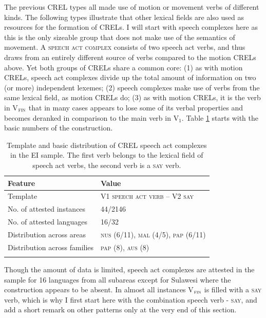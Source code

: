 The previous CREL types all made use of motion or movement verbs of different kinds. The following types  illustrate that other lexical fields are also used as resources for the formation of CRELs. I will start with speech complexes here as this is the only sizeable group that does not make use of the semantics of movement. A \textsc{speech act complex} consists of two speech act verbs, and thus draws from an entirely different source of verbs compared to the motion CRELs above. Yet both groups of CRELs share a common core: (1) as with motion CRELs, speech act complexes divide up the total amount of information on two (or more) independent lexemes; (2) speech complexes make use of verbs from the same lexical field, as motion CRELs do; (3) as with motion CRELs, it is the verb in V$_{\textsc{fin}}$ that in many cases appears to lose some of its verbal properties and becomes deranked in comparison to the main verb in V$_{1}$. Table \ref{table:basiccrelspeech} starts with the basic numbers of the construction.

\begin{table}
\begin{tabular}{ll}
\lsptoprule
Feature&Value\tabularnewline
\midrule
Template&V1 \textsc{speech act verb} -- V2 \textsc{\textsc{say}}\tabularnewline
No. of attested instances& 44/2146 \tabularnewline
No. of attested languages& 16/32 \tabularnewline
Distribution across areas& \textsc{nus} (6/11), \textsc{mal} (4/5), \textsc{pap} (6/11) \tabularnewline
Distribution across families& \textsc{pap} (8), \textsc{aus} (8) \tabularnewline
\lspbottomrule
\end{tabular}
\caption[Template and basic distribution of CREL speech act complexes]{Template and basic distribution of CREL speech act complexes in the EI sample. The first verb belongs to the lexical field of speech act verbs, the second verb is a \textsc{say} verb.}
\label{table:basiccrelspeech}
\end{table}

Though the amount of data is limited, speech act complexes are attested in the sample for 16 languages from all subareas except for Sulawesi where the construction appears to be absent. In almost all instances V$_{\textsc{fin}}$ is filled with a \textsc{say} verb, which is why I first start here with the combination speech verb - \textsc{say}, and add a short remark on other patterns only at the very end of this section. 

